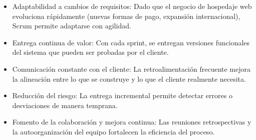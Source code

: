 \begin{itemize}
    \item {Adaptabilidad a cambios de requisitos: Dado que el negocio de hospedaje web evoluciona rápidamente (nuevas formas de pago, expansión internacional), Scrum permite adaptarse con agilidad.}
    \item {Entrega continua de valor: Con cada sprint, se entregan versiones funcionales del sistema que pueden ser probadas por el cliente.}
    \item {Comunicación constante con el cliente: La retroalimentación frecuente mejora la alineación entre lo que se construye y lo que el cliente realmente necesita.}
    \item {Reducción del riesgo: La entrega incremental permite detectar errores o desviaciones de manera temprana.}
    \item {Fomento de la colaboración y mejora continua: Las reuniones retrospectivas y la autoorganización del equipo fortalecen la eficiencia del proceso.}
\end{itemize}

